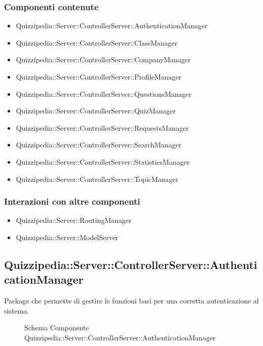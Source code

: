 \subsubsection{Componenti contenute}
\begin{itemize}
\item Quizzipedia::Server::ControllerServer::AuthenticationManager
\item Quizzipedia::Server::ControllerServer::ClassManager
\item Quizzipedia::Server::ControllerServer::CompanyManager
\item Quizzipedia::Server::ControllerServer::ProfileManager
\item Quizzipedia::Server::ControllerServer::QuestionsManager
\item Quizzipedia::Server::ControllerServer::QuizManager
\item Quizzipedia::Server::ControllerServer::RequestsManager
\item Quizzipedia::Server::ControllerServer::SearchManager
\item Quizzipedia::Server::ControllerServer::StatisticsManager
\item Quizzipedia::Server::ControllerServer::TopicManager
\end{itemize}
\subsubsection{Interazioni con altre componenti}
\begin{itemize}
\item Quizzipedia::Server::RoutingManager
\end{itemize}
\begin{itemize}
\item Quizzipedia::Server::ModelServer
\end{itemize}
\subsection{Quizzipedia::Server::ControllerServer::AuthenticationManager}
Package che permette di gestire le funzioni basi per una corretta autenticazione al sistema.
\begin{figure}[H]
\centering
\noindent{}
\caption[Quizzipedia::Server::ControllerServer::AuthenticationManager]{Schema Componente Quizzipedia::Server::ControllerServer::AuthenticationManager}
\end{figure}
